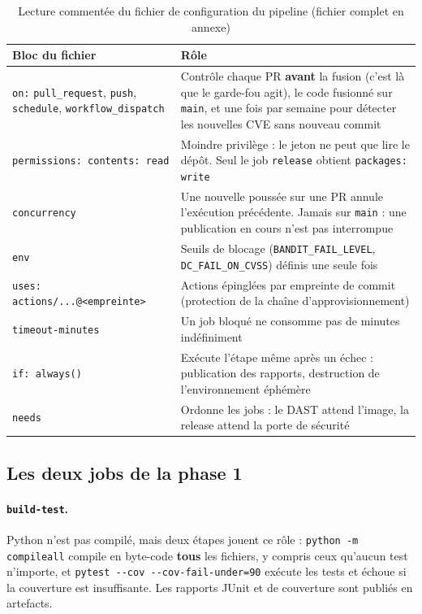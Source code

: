\documentclass[11pt,a4paper]{article}
\newcommand{\code}[1]{\texttt{#1}}
\begin{document}
\begin{table}[H]
\centering
\small
\begin{tabularx}{\textwidth}{@{}lL@{}}
\toprule
\textbf{Bloc du fichier} & \textbf{Rôle} \\
\midrule
\code{on:} \code{pull\_request}, \code{push}, \code{schedule}, \code{workflow\_dispatch} & Contrôle chaque PR \textbf{avant} la fusion (c'est là que le garde-fou agit), le code fusionné sur \code{main}, et une fois par semaine pour détecter les nouvelles CVE sans nouveau commit \\
\code{permissions: contents: read} & Moindre privilège : le jeton ne peut que lire le dépôt. Seul le job \code{release} obtient \code{packages: write} \\
\code{concurrency} & Une nouvelle poussée sur une PR annule l'exécution précédente. Jamais sur \code{main} : une publication en cours n'est pas interrompue \\
\code{env} & Seuils de blocage (\code{BANDIT\_FAIL\_LEVEL}, \code{DC\_FAIL\_ON\_CVSS}) définis une seule fois \\
\code{uses: actions/...@<empreinte>} & Actions épinglées par empreinte de commit (protection de la chaîne d'approvisionnement) \\
\code{timeout-minutes} & Un job bloqué ne consomme pas de minutes indéfiniment \\
\code{if: always()} & Exécute l'étape même après un échec : publication des rapports, destruction de l'environnement éphémère \\
\code{needs} & Ordonne les jobs : le DAST attend l'image, la release attend la porte de sécurité \\
\bottomrule
\end{tabularx}
\caption{Lecture commentée du fichier de configuration du pipeline (fichier complet en annexe)}
\end{table}

\subsection{Les deux jobs de la phase 1}
\paragraph{\code{build-test}.} Python n'est pas compilé, mais deux étapes jouent ce rôle :
\code{python -m compileall} compile en byte-code \textbf{tous} les fichiers, y compris ceux
qu'aucun test n'importe, et \code{pytest -{}-cov -{}-cov-fail-under=90} exécute les tests et échoue si
la couverture est insuffisante. Les rapports JUnit et de couverture sont publiés en artefacts.
\end{document}
